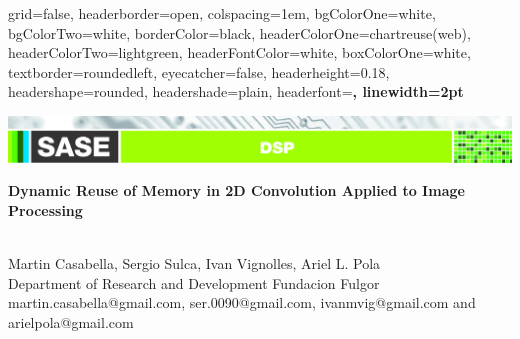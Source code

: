 \documentclass[a1paper,portrait,fontscale=0.43]{baposter}
\begin{document}

\begin{poster}
{
grid=false,
headerborder=open, %
colspacing=1em, %
bgColorOne=white, %
bgColorTwo=white, %
borderColor=black, %
headerColorOne=chartreuse(web), %
headerColorTwo=lightgreen, %
headerFontColor=white, %
boxColorOne=white, %
textborder=roundedleft, %
eyecatcher=false, %
headerheight=0.18\textheight, %
headershape=rounded, %
headershade=plain,
headerfont=\Large\bf\textsf, %
linewidth=2pt %
}
{}
%
%
{  
  {\includegraphics[trim=1.7cm 0 0 0.5cm, width=247mm]{DSP-02}\vspace{0.5em}}%


  \bf\textsf %
  {Dynamic Reuse of Memory in 2D Convolution Applied to Image Processing}
} %
{{\sf\vspace{0.2em}\\
    Martin Casabella,
    Sergio Sulca,
    Ivan Vignolles,
    Ariel L. Pola
\vspace{0.2em}\\
\small{Department of Research and Development Fundacion Fulgor 
\vspace{0.2em}\\
martin.casabella@gmail.com, ser.0090@gmail.com,
    ivanmvig@gmail.com and arielpola@gmail.com}
}}


\end{poster}
\end{document}
